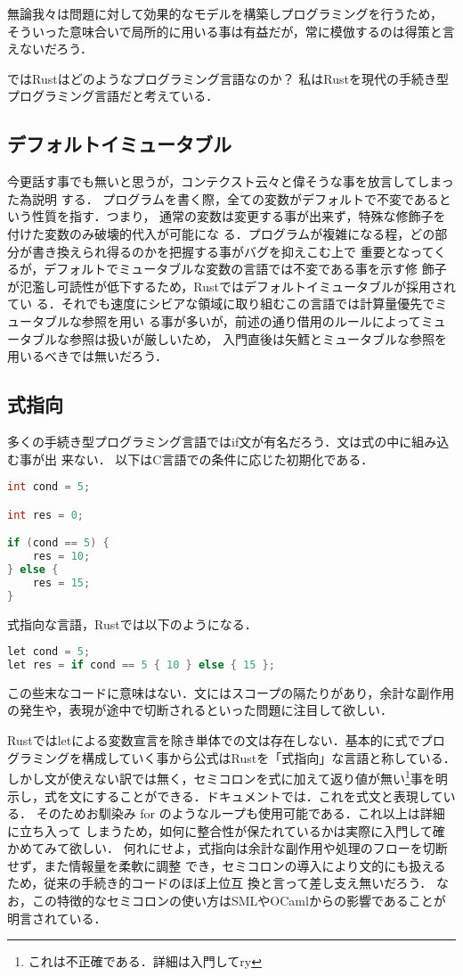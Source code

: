 無論我々は問題に対して効果的なモデルを構築しプログラミングを行うため，
そういった意味合いで局所的に用いる事は有益だが，常に模倣するのは得策と言えないだろう．

ではRustはどのようなプログラミング言語なのか？
私はRustを現代の手続き型プログラミング言語だと考えている．

\subsection{デフォルトイミュータブル}
今更話す事でも無いと思うが，コンテクスト云々と偉そうな事を放言してしまった為説明
する．
プログラムを書く際，全ての変数がデフォルトで不変であるという性質を指す．つまり，
通常の変数は変更する事が出来ず，特殊な修飾子を付けた変数のみ破壊的代入が可能にな
る．プログラムが複雑になる程，どの部分が書き換えられ得るのかを把握する事がバグを抑えこむ上で
重要となってくるが，デフォルトでミュータブルな変数の言語では不変である事を示す修
飾子が氾濫し可読性が低下するため，Rustではデフォルトイミュータブルが採用されてい
る．それでも速度にシビアな領域に取り組むこの言語では計算量優先でミュータブルな参照を用い
る事が多いが，前述の通り借用のルールによってミュータブルな参照は扱いが厳しいため，
入門直後は矢鱈とミュータブルな参照を用いるべきでは無いだろう．

\subsection{式指向}
多くの手続き型プログラミング言語ではif文が有名だろう．文は式の中に組み込む事が出
来ない．
以下はC言語での条件に応じた初期化である．

\begin{lstlisting}[language={C},caption=Cにおけるif文,label=c_if]
int cond = 5;

int res = 0;

if (cond == 5) {
    res = 10;
} else {
    res = 15;
}
\end{lstlisting}
式指向な言語，Rustでは以下のようになる．
\begin{lstlisting}[language={C++},caption=Rustにおけるif式,label=rust_if]
let cond = 5;
let res = if cond == 5 { 10 } else { 15 };
\end{lstlisting}
この些末なコードに意味はない．文にはスコープの隔たりがあり，余計な副作用の発生や，表現が途中で切断されるといった問題に注目して欲しい．

Rustではletによる変数宣言を除き単体での文は存在しない．基本的に式でプログラミングを構成していく事から公式はRustを「式指向」な言語と称している．
しかし文が使えない訳では無く，セミコロンを式に加えて返り値が無い\footnote{これは不正確である．詳細は入門してry}事を明示し，式を文にすることができる．ドキュメントでは．これを式文と表現している．
そのためお馴染み for のようなループも使用可能である．これ以上は詳細に立ち入って
しまうため，如何に整合性が保たれているかは実際に入門して確かめてみて欲しい．
何れにせよ，式指向は余計な副作用や処理のフローを切断せず，また情報量を柔軟に調整
でき，セミコロンの導入により文的にも扱えるため，従来の手続き的コードのほぼ上位互
換と言って差し支え無いだろう．
なお，この特徴的なセミコロンの使い方はSMLやOCamlからの影響であることが明言されている．\cite{inf}

